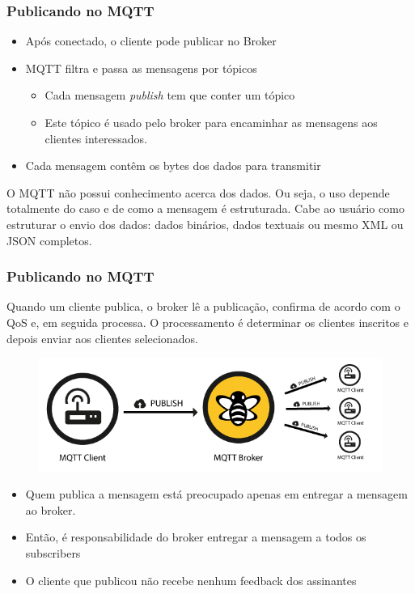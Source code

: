 \documentclass{beamer}
\begin{document}
\begin{frame}
\frametitle{Publicando no MQTT}

\begin{itemize}
\item Após conectado, o cliente pode publicar no Broker
\item MQTT filtra e passa as mensagens por tópicos

\begin{itemize}
\item Cada mensagem \emph{publish} tem que conter um tópico
\item Este tópico é usado pelo broker para encaminhar as mensagens aos clientes interessados.
\end{itemize}

\item Cada mensagem contêm os bytes dos dados para transmitir
\end{itemize}


\begin{block}{}   
    O MQTT não possui conhecimento acerca dos dados. Ou seja, o uso depende totalmente do caso e de como a mensagem é estruturada. Cabe ao usuário como estruturar o envio dos dados: dados binários, dados textuais ou mesmo XML ou JSON completos.
\end{block}


\end{frame}

\begin{frame}
\frametitle{Publicando no MQTT}

\begin{block}{}
Quando um cliente publica, o broker lê a publicação, confirma de acordo com o QoS e, em seguida processa. O processamento é determinar os clientes inscritos e depois enviar aos clientes selecionados.
\end{block}

\begin{figure}
\centering
\includegraphics[scale=0.3]{MQTT-PublishFlow}
\end{figure}

\begin{itemize}
\item Quem publica a mensagem está preocupado apenas em entregar a mensagem ao broker.
\item Então, é responsabilidade do broker entregar a mensagem a todos os subscribers
\item O cliente que publicou não recebe nenhum feedback dos assinantes

\end{itemize}


\end{frame}
\end{document}
